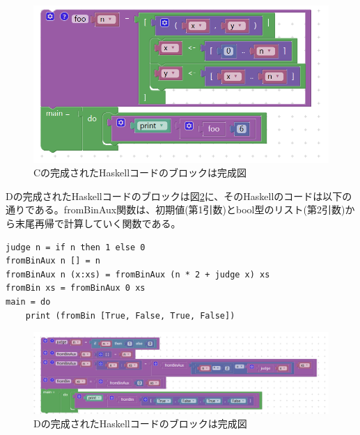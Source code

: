 \documentclass{risepaper}
\begin{document}
\begin{itemize}
\begin{figure}[h]
\begin{center}
\includegraphics[scale=0.5]{img/haskell_experiment_result_c.PNG}
\caption{Cの完成されたHaskellコードのブロックは完成図}%
\label{fig:haskell_experiment_result_c}
\end{center}%
\end{figure}%

Dの完成されたHaskellコードのブロックは図\ref{fig:haskell_experiment_result_d}に、そのHaskellのコードは以下の通りである。fromBinAux関数は、初期値(第1引数)とbool型のリスト(第2引数)から末尾再帰で計算していく関数である。

\begin{lstlisting}[basicstyle=\ttfamily\footnotesize]
judge n = if n then 1 else 0
fromBinAux n [] = n
fromBinAux n (x:xs) = fromBinAux (n * 2 + judge x) xs
fromBin xs = fromBinAux 0 xs
main = do
    print (fromBin [True, False, True, False])
\end{lstlisting}

\begin{figure}[h]
\begin{center}
\includegraphics[scale=0.5]{img/haskell_experiment_result_d.PNG}
\caption{Dの完成されたHaskellコードのブロックは完成図}%
\label{fig:haskell_experiment_result_d}
\end{center}%
\end{figure}%

\end{itemize} 
\end{document}

